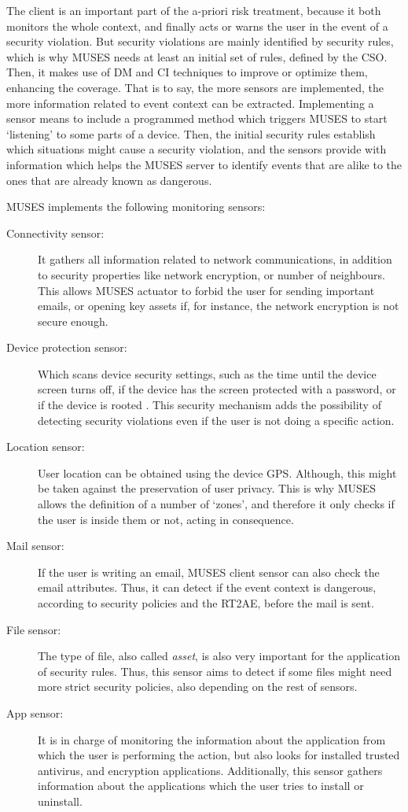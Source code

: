 The client is an important part of the a-priori risk treatment, because it both monitors the whole context, and finally acts or warns the user in the event of a security violation. 
But security violations are mainly identified by security rules, which is why MUSES needs at least an initial set of rules, defined by the CSO. Then, it makes use of DM and CI techniques to improve or optimize them, enhancing the coverage. 
That is to say, the more sensors are implemented, the more information related to event context can be extracted. Implementing a sensor means to include a programmed method which triggers MUSES to start `listening' to some parts of a device. Then, the initial security rules establish which situations might cause a security violation, and the sensors provide with information which helps the MUSES server to identify events that are alike to the ones that are already known as dangerous.

MUSES implements the following monitoring sensors:

\begin{description}
  \item[Connectivity sensor:] It gathers all information related to network communications, in addition to security properties like network encryption, or number of neighbours. This allows MUSES actuator to forbid the user for sending important emails, or opening key assets if, for instance, the network encryption is not secure enough. 
  \item[Device protection sensor:] Which scans device security settings, such as the time until the device screen turns off, if the device has the screen protected with a password, or if the device is rooted \cite{hildenbrand2014}. This security mechanism adds the possibility of detecting security violations even if the user is not doing a specific action.
  \item[Location sensor:] User location can be obtained using the device GPS. Although, this might be taken against the preservation of user privacy. This is why MUSES allows the definition of a number of `zones', and therefore it only checks if the user is inside them or not, acting in consequence.
  \item[Mail sensor:] If the user is writing an email, MUSES client sensor can also check the email attributes. Thus, it can detect if the event context is dangerous, according to security policies and the RT2AE, before the mail is sent.
  \item[File sensor:] The type of file, also called \textit{asset}, is also very important for the application of security rules. Thus, this sensor aims to detect if some files might need more strict security policies, also depending on the rest of sensors.
  \item[App sensor:] It is in charge of monitoring the information about the application from which the user is performing the action, but also looks for installed trusted antivirus, and encryption applications. Additionally, this sensor gathers information about the applications which the user tries to install or uninstall.
\end{description}

